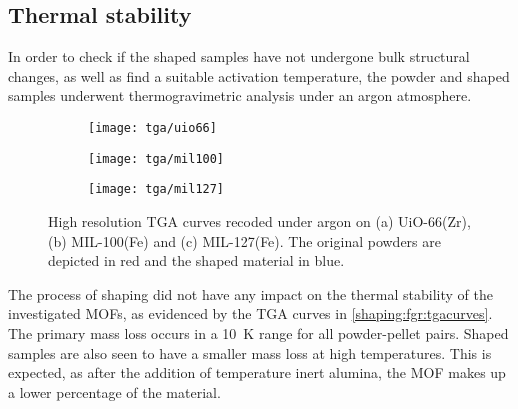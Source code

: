 
\subsection{Thermal stability}

In order to check if the shaped samples have not undergone bulk
structural changes, as well as find a suitable activation temperature,
the powder and shaped samples underwent thermogravimetric analysis
under an argon atmosphere.

\begin{figure}
	\centering
	\begin{subfigure}{0.85\textwidth}
		\parbox[c]{0.1\linewidth}{\caption{}\label{shaping:fgr:tgauio66}}%
		\parbox[b]{0.7\linewidth}{%
			\texttt{[image: tga/uio66]}%
		}%
	\end{subfigure}%

	\begin{subfigure}{0.85\textwidth}
		\parbox[c]{0.1\linewidth}{\caption{}\label{shaping:fgr:tgamil100}}%
		\parbox[b]{0.7\linewidth}{%
			\texttt{[image: tga/mil100]}%
		}%
	\end{subfigure}%
	
	\begin{subfigure}{0.85\textwidth}
		\parbox[c]{0.1\linewidth}{\caption{}\label{shaping:fgr:tgamil127}}%
		\parbox[b]{0.7\linewidth}{%
			\texttt{[image: tga/mil127]}%
		}%
	\end{subfigure}%

	\caption{High resolution TGA curves recoded under argon
		on (a) UiO-66(Zr), (b) MIL-100(Fe) and (c) MIL-127(Fe). The
		original powders are depicted in red and the shaped material
		in blue.}%
	\label{shaping:fgr:tgacurves}

\end{figure}

The process of shaping did not have any impact on the thermal stability of
the investigated MOFs, as evidenced by the TGA curves in
\autoref{shaping:fgr:tgacurves}. The primary mass loss occurs
in a \SI{10}{\kelvin} range for all powder-pellet pairs.
Shaped samples are also seen to have a smaller mass loss
at high temperatures. This is expected, as after the addition of
temperature inert alumina, the MOF makes up a lower percentage of
the material.